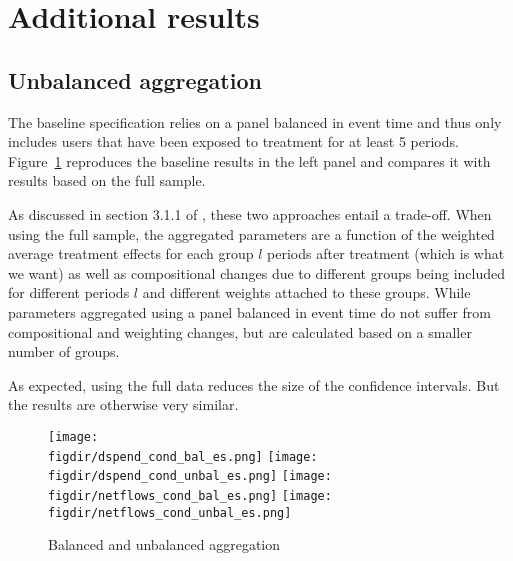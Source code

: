 
\section{Additional results}%
\label{sec:additional_results}

\subsection{Unbalanced aggregation}%
\label{sub:unbalanced_aggregation}

The baseline specification relies on a panel balanced in event time and
thus only includes users that have been exposed to treatment for at least 5
periods. Figure~\ref{fig:ub_comp} reproduces the baseline results in the left
panel and compares it with results based on the full sample.

As discussed in section 3.1.1 of \citet{callaway2021difference}, these two
approaches entail a trade-off. When using the full sample, the aggregated
parameters are a function of the weighted average treatment effects for each
group $l$ periods after treatment (which is what we want) as well as
compositional changes due to different groups being included for different
periods $l$ and different weights attached to these groups. While parameters
aggregated using a panel balanced in event time do not suffer from
compositional and weighting changes, but are calculated based on a smaller
number of groups.

As expected, using the full data reduces the size of the confidence intervals.
But the results are otherwise very similar.

\begin{figure}[h]
    \centering
    \caption{Balanced and unbalanced aggregation}%
    \label{fig:ub_comp}
    \texttt{[image: \\figdir/dspend\_cond\_bal\_es.png]}
    \texttt{[image: \\figdir/dspend\_cond\_unbal\_es.png]}
    \texttt{[image: \\figdir/netflows\_cond\_bal\_es.png]}
    \texttt{[image: \\figdir/netflows\_cond\_unbal\_es.png]}
\end{figure}



